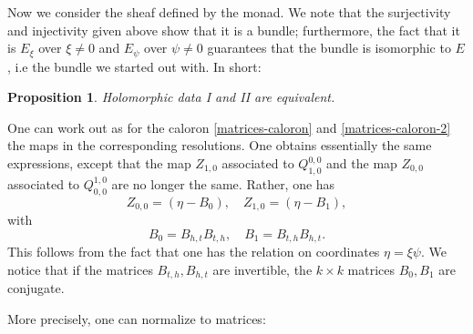\documentclass[12pt]{article}
\newtheorem{proposition}[theorem]{Proposition}
\theoremstyle{definition}
\theoremstyle{remark}
\numberwithin{theorem}{section}
\begin{document}
Now we consider the sheaf defined by the monad. We note that the surjectivity and injectivity given above show that it is a bundle; furthermore, the fact that it is   $E_\xi$ over $\xi\neq 0$ and $E_\psi$ over $\psi\neq 0$ guarantees that the bundle is isomorphic to $E$, i.e the bundle we started out with. In short:

\begin{proposition} Holomorphic data I and II are equivalent.\end{proposition}

 
One can work out as for the caloron \eqref{matrices-caloron} and \eqref{matrices-caloron-2} the maps in the corresponding resolutions. One obtains essentially the same expressions, except that the map $Z_{1,0}$  associated to $Q_{ 1,0}^{0,0}$ and the map $Z_{0 ,0}$ associated to $Q_{0 ,0}^{1,0}$ are no longer the same. Rather, one has
$$Z_{0 ,0}= (\eta-B_{0}),\quad  Z_{1,0} = (\eta-B_{1}),$$
with 
$$ B_{0}= B_{h,t}B_{t,h},\quad B_1=B_{t,h}B_{h,t}.$$
This follows from the fact that one has the relation on coordinates $\eta = \xi\psi$. We notice that if the matrices $B_{t,h},B_{h,t}$ are invertible, the $k\times k$ matrices $B_{ 0},B_{1}$ are conjugate. 

More precisely, one can normalize to matrices:
\end{document}
